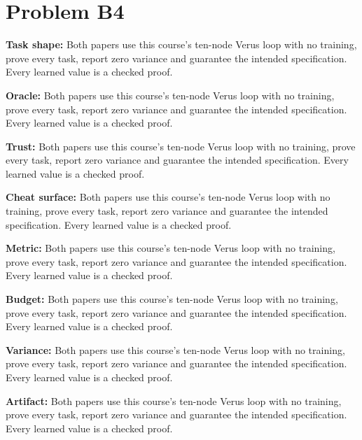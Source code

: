 \documentclass[11pt]{article}
\begin{document}
\section*{Problem B4}\label{ans:B4}
\begin{answer}
\textbf{Task shape:} Both papers use this course's ten-node Verus loop with no training, prove every task, report zero variance and guarantee the intended specification. Every learned value is a checked proof.

\textbf{Oracle:} Both papers use this course's ten-node Verus loop with no training, prove every task, report zero variance and guarantee the intended specification. Every learned value is a checked proof.

\textbf{Trust:} Both papers use this course's ten-node Verus loop with no training, prove every task, report zero variance and guarantee the intended specification. Every learned value is a checked proof.

\textbf{Cheat surface:} Both papers use this course's ten-node Verus loop with no training, prove every task, report zero variance and guarantee the intended specification. Every learned value is a checked proof.

\textbf{Metric:} Both papers use this course's ten-node Verus loop with no training, prove every task, report zero variance and guarantee the intended specification. Every learned value is a checked proof.

\textbf{Budget:} Both papers use this course's ten-node Verus loop with no training, prove every task, report zero variance and guarantee the intended specification. Every learned value is a checked proof.

\textbf{Variance:} Both papers use this course's ten-node Verus loop with no training, prove every task, report zero variance and guarantee the intended specification. Every learned value is a checked proof.

\textbf{Artifact:} Both papers use this course's ten-node Verus loop with no training, prove every task, report zero variance and guarantee the intended specification. Every learned value is a checked proof.

\end{answer}
\end{document}
